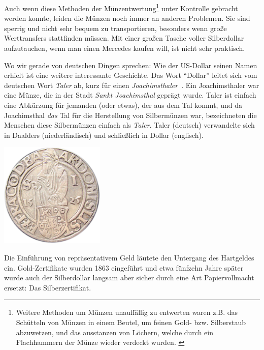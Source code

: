 Auch wenn diese Methoden der Münzentwertung\footnote{ Weitere Methoden um Münzen
unauffällig zu entwerten waren z.B. das Schütteln von Münzen in einem Beutel, um
feinen Gold- bzw. Silberstaub abzuwetzen, und das ausstanzen von Löchern, welche
durch ein Flachhammern der Münze wieder verdeckt wurden.
\cite{wiki:coin-debasement} } unter Kontrolle gebracht werden konnte, leiden die
Münzen noch immer an anderen Problemen. Sie sind sperrig und nicht sehr bequem
zu transportieren, besonders wenn große Werttransfers stattfinden müssen. Mit
einer großen Tasche voller Silberdollar aufzutauchen, wenn man einen Mercedes
kaufen will, ist nicht sehr praktisch.

Wo wir gerade von deutschen Dingen sprechen: Wie der US-Dollar seinen Namen
erhielt ist eine weitere interessante Geschichte. Das Wort \enquote{Dollar}
leitet sich vom deutschen Wort \textit{Taler} ab, kurz für einen
\textit{Joachimsthaler}~\cite{wiki:thaler}. Ein Joachimsthaler war eine Münze,
die in der Stadt \textit{Sankt Joachimsthal} geprägt wurde. Taler ist einfach
eine Abkürzung für jemanden (oder etwas), der aus dem Tal kommt, und da
Joachimsthal \textit{das} Tal für die Herstellung von Silbermünzen war,
bezeichneten die Menschen diese Silbermünzen einfach als \textit{Taler}. Taler (deutsch)
verwandelte sich in Daalders (niederländisch) und schließlich in Dollar
(englisch).

\begin{center}
  \centering
  \includegraphics[width=5cm]{assets/images/joachimsthaler.png}
  \label{fig:joachimsthaler}
\end{center}

Die Einführung von repräsentativem Geld läutete den Untergang des Hartgeldes
ein. Gold-Zertifikate wurden 1863 eingeführt und etwa fünfzehn Jahre später
wurde auch der Silberdollar langsam aber sicher durch eine Art Papiervollmacht
ersetzt: Das Silberzertifikat. \cite{wiki:silver-certificate}

